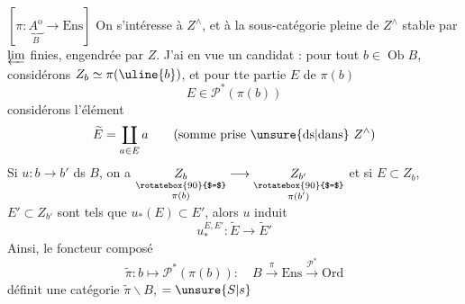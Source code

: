 $[\pi:\underbrace{A^{\mathrm o}}_B\longrightarrow\mathrm{Ens}]$ On s'intéresse à $Z^\wedge$, et à la sous-catégorie pleine de $Z^\wedge$  stable par $\varprojlim$ finies, engendrée par $Z$. J'ai en vue un candidat : pour tout $b\in\operatorname{Ob}B$, considérons $Z_b\simeq\pi(\uline{b})$, et pour tte partie  $E$ de $\pi(b)$
\[
 E\in\mathcal P^*(\pi(b))
\]
considérons l'élément
\[
 \widetilde E=\coprod_{a\in E}a\qquad(\text{somme prise \unsure{ds|dans} }Z^\wedge)
\]
Si $u:b\longrightarrow b'$ ds $B$, on a  $\underset{\substack{\rotatebox{90}{$=$}\\\pi(b)}}{Z_b}\longrightarrow\underset{\substack{\rotatebox{90}{$=$}\\\pi(b')}}{Z_{b'}}$ et si $E\subset Z_b$, $E'\subset Z_{b'}$ sont tels que $u_*(E)\subset E'$, alors $u$ induit
\[
 u_*^{E,E'}:\widetilde E\longrightarrow\widetilde E'
\]
Ainsi, le foncteur composé
\[
 \widetilde\pi:b\longmapsto\mathcal P^*(\pi(b)):\quad B\xrightarrow{\pi}\mathrm{Ens}\xrightarrow{\mathcal P^*}\mathrm{Ord}
\]
définit une catégorie $\widetilde\pi\backslash B$,  $=\unsure{S|s}$

